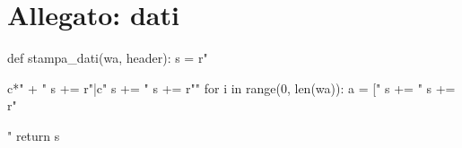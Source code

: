 \section{Allegato: dati}
\begin{sagesilent}
def stampa_dati(wa, header):
  s = r"\begin{tabular}{c*{" + "%
  s += r"}{|c}}"
  s += "%
  s += r"\midrule"
  for i in range(0, len(wa)):
    a = ["%
    s += "%
  s += r"\end{tabular}"
  return s
\end{sagesilent}

\begin{center}

\end{center}

